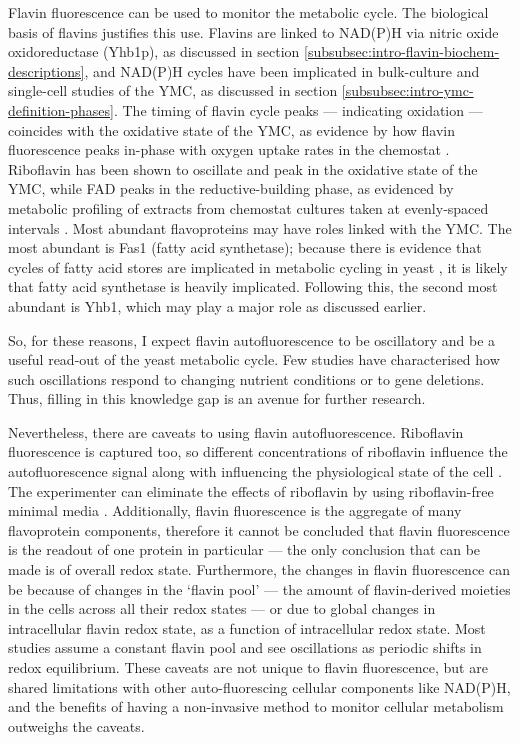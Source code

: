 Flavin fluorescence can be used to monitor the metabolic cycle.
The biological basis of flavins justifies this use.
Flavins are linked to NAD(P)H via nitric oxide oxidoreductase (Yhb1p), as discussed in section \ref{subsubsec:intro-flavin-biochem-descriptions}, and NAD(P)H cycles have been implicated in bulk-culture \citep{tuLogicYeastMetabolic2005} %
and single-cell \citep{papagiannakisAutonomousMetabolicOscillations2017} studies of the YMC, as discussed in section \ref{subsubsec:intro-ymc-definition-phases}.
The timing of flavin cycle peaks --- indicating oxidation --- coincides with the oxidative state of the YMC, as evidence by how flavin fluorescence peaks in-phase with oxygen uptake rates in the chemostat \citep{murrayRedoxRegulationRespiring2011,sasidharanTimeStructureYeastMetabolism2012}.
Riboflavin has been shown to oscillate and peak in the oxidative state of the YMC, while FAD peaks in the reductive-building phase, as evidenced by metabolic profiling of extracts from chemostat cultures taken at evenly-spaced intervals \parencite{tuCyclicChangesMetabolic2007}.
Most abundant flavoproteins may have roles linked with the YMC.
The most abundant is Fas1 (fatty acid synthetase); because there is evidence that cycles of fatty acid stores are implicated in metabolic cycling in yeast \citep{campbellBuildingBlocksAre2020}, it is likely that fatty acid synthetase is heavily implicated.
Following this, the second most abundant is Yhb1, which may play a major role as discussed earlier.

So, for these reasons, I expect flavin autofluorescence to be oscillatory and be a useful read-out of the yeast metabolic cycle.
Few studies have characterised how such oscillations respond to changing nutrient conditions or to gene deletions.
Thus, filling in this knowledge gap is an avenue for further research.

Nevertheless, there are caveats to using flavin autofluorescence.
Riboflavin fluorescence is captured too, so different concentrations of riboflavin influence the autofluorescence signal along with influencing the physiological state of the cell \citep{maslankaAutofluorescenceYeastSaccharomyces2018}.
The experimenter can eliminate the effects of riboflavin by using riboflavin-free minimal media \citep{verduynEffectBenzoicAcid1992}.
Additionally, flavin fluorescence is the aggregate of many flavoprotein components, therefore it cannot be concluded that flavin fluorescence is the readout of one protein in particular --- the only conclusion that can be made is of overall redox state.
Furthermore, the changes in flavin fluorescence can be because of changes in the `flavin pool' --- the amount of flavin-derived moieties in the cells across all their redox states --- or due to global changes in intracellular flavin redox state, as a function of intracellular redox state.
Most studies assume a constant flavin pool and see oscillations as periodic shifts in redox equilibrium.
These caveats are not unique to flavin fluorescence, but are shared limitations with other auto-fluorescing cellular components like NAD(P)H, and the benefits of having a non-invasive method to monitor cellular metabolism outweighs the caveats.

